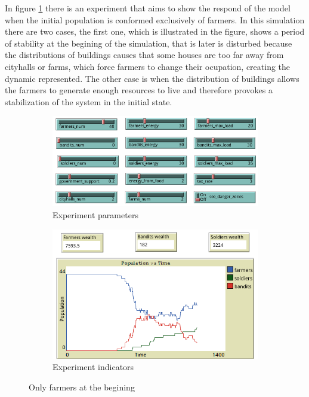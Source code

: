 \documentclass{wscpaperproc}
\begin{document}
In figure \ref{only_farmers} there is an experiment that aims to show the respond
of the model when the initial population is conformed exclusively of farmers. In
this simulation there are two cases, the first one, which is illustrated in the
figure, shows a period of stability at the begining of the simulation, that is
later is disturbed because the distributions of buildings causes that
some houses are too far away from cityhalls or farms, which force
farmers to change their ocupation, creating the dynamic represented. The other case
is when the distribution of buildings allows the farmers to generate enough
resources to live and therefore provokes a stabilization of the system in the
initial state.\\

\begin{figure}[h!]
    \begin{subfigure}{0.45\textwidth}
    \includegraphics[width=\textwidth]{Images/Exp2_sliders.png}
    \caption{Experiment parameters}
    \end{subfigure}
    \hfill
    \begin{subfigure}{0.45\textwidth}
    \includegraphics[width=\textwidth]{Images/Exp2_indicators.png}
    \caption{Experiment indicators}
    \end{subfigure}%
    \caption{Only farmers at the begining}
    \label{only_farmers}
\end{figure}
\end{document}
